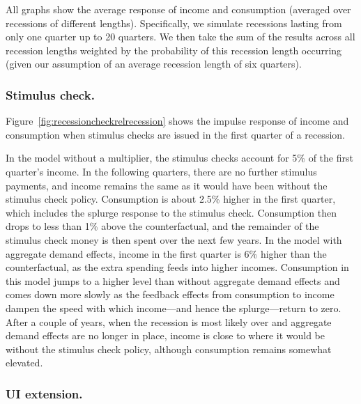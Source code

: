 \documentclass[\latexroot/\projectname]{subfiles}
\begin{document}
All graphs show the average response of income and consumption (averaged over recessions of different lengths).
Specifically, we simulate recessions lasting from only one quarter up to 20 quarters.
We then take the sum of the results across all recession lengths weighted by the probability of this recession length occurring (given our assumption of an average recession length of six quarters).

\subsubsection{Stimulus check.}

Figure~\ref{fig:recessioncheckrelrecession} shows the impulse response of income and consumption when stimulus checks are issued in the first quarter of a recession.


In the model without a multiplier, the stimulus checks account for 5\% of the first quarter's income.
In the following quarters, there are no further stimulus payments, and income remains the same as it would have been without the stimulus check policy.
Consumption is about 2.5\% higher in the first quarter, which includes the splurge response to the stimulus check.
Consumption then drops to less than 1\% above the counterfactual, and the remainder of the stimulus check money is then spent over the next few years.
In the model with aggregate demand effects, income in the first quarter is 6\% higher than the counterfactual, as the extra spending feeds into higher incomes.
Consumption in this model jumps to a higher level than without aggregate demand effects and comes down more slowly as the feedback effects from consumption to income dampen the speed with which income---and hence the splurge---return to zero.
After a couple of years, when the recession is most likely over and aggregate demand effects are no longer in place, income is close to where it would be without the stimulus check policy, although consumption remains somewhat elevated.

\subsubsection{UI extension.}
\end{document}
